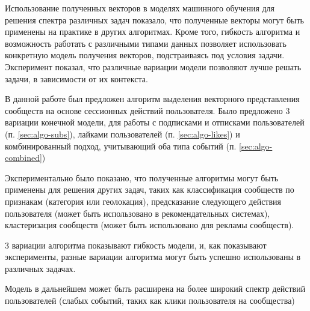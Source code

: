 \documentclass[times,specification,annotation]{itmo-student-thesis}
\begin{document}
Использование полученных векторов в моделях машинного обучения для решения спектра различных задач показало, что полученные векторы могут быть применены на практике в других алгоритмах. Кроме того, гибкость алгоритма и возможность работать с различными типами данных позволяет использовать конкретную модель получения векторов, подстраиваясь под условия задачи. Эксперимент показал, что различные вариации модели позволяют лучше решать задачи, в зависимости от их контекста. 


\startconclusionpage

В данной работе был предложен алгоритм выделения векторного представления сообществ на основе сессионных действий пользователя. Было предложено 3 вариации конечной модели, для работы с подписками и отписками пользователей (п. \ref{sec:algo-subs}), лайками пользователей (п. \ref{sec:algo-likes}) и комбинированный подход, учитывающий оба типа событий (п. \ref{sec:algo-combined})

Экспериментально было показано, что полученные алгоритмы могут быть применены для решения других задач, таких как классификация сообществ по признакам (категория или геолокация), предсказание следующего действия пользователя (может быть использовано в рекомендательных системах), кластеризация сообществ (может быть использовано для рекламы сообществ).

3 вариации алгоритма показывают гибкость модели, и, как показывают эксперименты, разные вариации алгоритма могут быть успешно использованы в различных задачах. 

Модель в дальнейшем может быть расширена на более широкий спектр действий пользователей (слабых событий, таких как клики пользователя на сообщества) 


\printmainbibliography

\appendix
\end{document}
